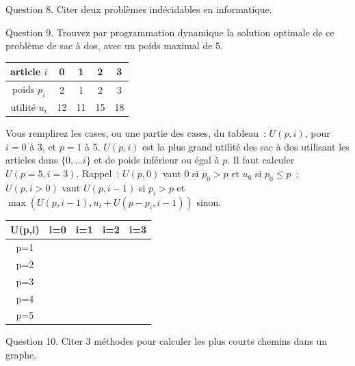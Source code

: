 \documentclass[a4paper,12pt]{article}
\begin{document}
Question 8. Citer deux problèmes indécidables en informatique.

Question 9. Trouvez par programmation dynamique la solution optimale de ce problème de sac à dos, avec un poids maximal de 5.
\begin{center}\begin{tabular}{|c|c|c|c|c|}\hline
article $i$ & 	0 & 	1 & 	2 & 	3\\\hline
poids $p_i$ & 	2 & 	1 & 	2 & 	3\\\hline
utilité  $u_i$ & 	12 & 	11 & 	15 & 	18\\\hline
\end{tabular}\end{center}
Vous remplirez les cases, ou une partie des cases, du tableau~: $U(p,i)$, pour $i=0$ à 3, et $p=1$ à 5. $U(p,i)$ est la plus grand utilité des sac à dos utilisant les articles dans $\{0, \ldots i\}$ et de poids inférieur ou égal à $p$. 
Il faut calculer $U(p=5, i=3)$.
Rappel~: $U(p, 0)$ vaut $0$ si $p_0>p$ et $u_0$ si $p_0\le p$~;
$U(p, i>0)$ vaut $U(p, i-1)$ si $p_i>p$ et $\max( U(p, i-1), u_i+ U(p-p_i, i-1))$ sinon.
\begin{center}\begin{tabular}{|c|c|c|c|c|}\hline
U(p,i) &       i=0 &     i=1 &     i=2 &     i=3\\\hline
p=1 &  &  &  &  \\\hline
p=2 & &  &  &  \\\hline
p=3 &  & & &  \\\hline
p=4 &  & & &  \\\hline
p=5 & & & & \\\hline
\end{tabular}\end{center}



Question 10. Citer 3 méthodes pour calculer les plus courts chemins dans un graphe.
\end{document}
